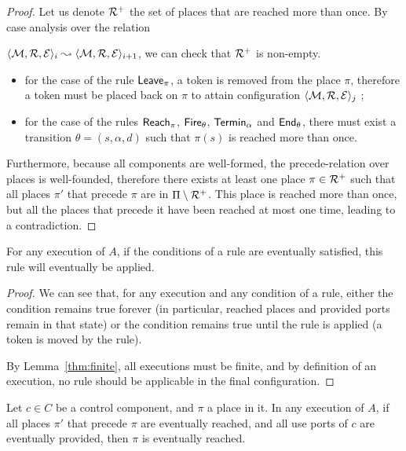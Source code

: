 {\begin{proof}
    \noindent Let us denote $\mathcal{R}^+$ the set of places that are reached more
    than once. By case analysis over the relation 
    
    \noindent $\langle \mathcal{M},\mathcal{R}, \mathcal{E} \rangle_i \leadsto \langle \mathcal{M}, \mathcal{R}, \mathcal{E}
    \rangle_{i+1}$, we can check that $\mathcal{R}^+$ is non-empty.
    \begin{itemize}
    \item for the case of the rule $\mathsf{Leave}_\pi$, a token is removed
      from the place $\pi$, therefore a token must be placed back on
      $\pi$ to attain configuration $\langle \mathcal{M}, \mathcal{R}, \mathcal{E}
      \rangle_j$ ;
    \item for the case of the rules $\mathsf{Reach}_\pi$, $\mathsf{Fire}_\theta$,
      $\mathsf{Termin}_\alpha$ and $\mathsf{End}_\theta$, there must exist a transition
      $\theta = (s, \alpha, d)$ such that $\pi(s)$ is reached
      more than once.
    \end{itemize}
    Furthermore, because all components are well-formed, the
    precede-relation over places is well-founded, therefore there
    exists at least one place $\pi \in \mathcal{R}^+$ such that all
    places $\pi'$ that precede $\pi$ are in $\Pi \setminus
    \mathcal{R}^+$. This place is reached more than once, but all the
    places that precede it have been reached at most one time, leading
    to a contradiction.
  \end{proof}

  \begin{lemma}\label{thm:applyrules}
    For any execution of $A$, if the conditions of a rule are
    eventually satisfied, this rule will eventually be applied.
  \end{lemma}

  \begin{proof}
    We can see that, for any execution and any condition of a rule,
    either the condition remains true forever (in particular, reached
    places and provided ports remain in that state) or the condition
    remains true until the rule is applied (\eg a token is moved by
    the rule).

    By Lemma~\ref{thm:finite}, all executions must be finite, and by
    definition of an execution, no rule should be applicable in the
    final configuration.
  \end{proof}

  \begin{lemma}\label{thm:reachedplaces}
    Let $c \in C$ be a control component, and $\pi$ a place in it. In any
    execution of $A$, if all places $\pi'$ that precede $\pi$ are
    eventually reached, and all use ports of $c$ are eventually
    provided, then $\pi$ is eventually reached.
  \end{lemma}

}
